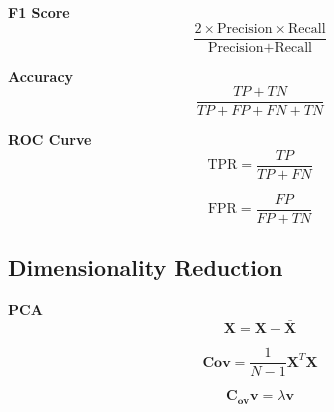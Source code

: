 \documentclass[8pt]{article}
\begin{document}
\begin{multicols}{2}
\textbf{F1 Score}
\begin{equation}
    \frac{2 \times \text{Precision} \times \text{Recall}}{\text{Precision} + \text{Recall}}
\end{equation}

\textbf{Accuracy}
\begin{equation}
    \frac{TP + TN}{TP + FP + FN + TN}
\end{equation}

\textbf{ROC Curve}
\begin{equation}
    \text{TPR} = \frac{TP}{TP + FN}
\end{equation}

\begin{equation}
    \text{FPR} = \frac{FP}{FP + TN}
\end{equation}

\subsection*{Dimensionality Reduction}
\textbf{PCA}
\begin{equation}
    \mathbf{X} = \mathbf{X} - \bar{\mathbf{X}}
\end{equation}

\begin{equation}
    \mathbf{Cov} = \frac{1}{N - 1} \mathbf{X}^T \mathbf{X}
\end{equation}

\begin{equation}
    \mathbf{C_{ov}} \mathbf{v} = \lambda \mathbf{v}
\end{equation}

\end{multicols}
\end{document}
